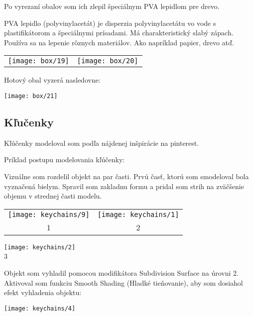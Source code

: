         Po vyrezaní obalov som ich zlepil špeciálnym PVA lepidlom pre drevo.

        PVA lepidlo (polyvinylacetát) je disperzia polyvinylacetátu vo vode s plastifikátorom a špeciálnymi prísadami. Má charakteristický slabý zápach. Používa sa na lepenie rôznych materiálov. Ako napríklad papier, drevo atď. \\

        \begin{tabular}{c c}
          \texttt{[image: box/19]} & \texttt{[image: box/20]} \\
        \end{tabular}
        Hotový obal vyzerá nasledovne:

        \begin{center}
          \texttt{[image: box/21]}
        \end{center}
      \subsection{Kľučenky}

        Kľúčenky modeloval som podľa nájdenej inšpirácie na pinterest.

        Príklad postupu modelovania kľúčenky:

        Vizuálne som rozdelil objekt na par časti. Prvú časť, ktorú som smodeloval bola vyznačená bielym. Spravil som zakladnu formu a pridal som strih na zväčšenie objemu v strednej časti modelu. \\

        \begin{tabular}{c c}
          \texttt{[image: keychains/9]} & \texttt{[image: keychains/1]} \\
          1 & 2 \\
        \end{tabular}

        \begin{center}
          \texttt{[image: keychains/2]} \\
          3
        \end{center}

        Objekt som vyhladil pomocou modifikátora Subdivision Surface na úrovni 2. Aktivoval som funkciu Smooth Shading (Hladké tieňovanie), aby som dosiahol efekt vyhladenia objektu: \\
        \begin{center}
          \texttt{[image: keychains/4]}
        \end{center}

